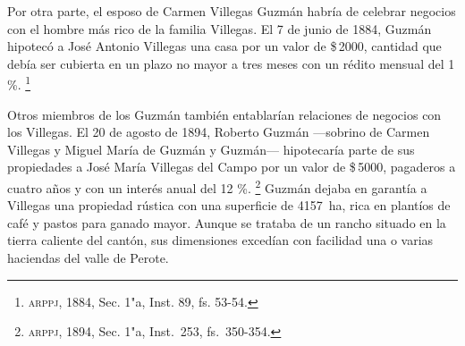 \documentclass[14pt,twoside,final]{extbook} %
\let\oldfootnote\footnote
\renewcommand\footnote[1]{%
\oldfootnote{\hspace{1mm}#1}}
\begin{document}
Por otra parte, el esposo de Carmen Villegas Guzmán habría de celebrar negocios con el hombre más rico de la familia Villegas. El 7 de junio de 1884, Guzmán hipotecó a José Antonio Villegas una casa por un valor de \$\,2000, cantidad que debía ser cubierta en un plazo no mayor a tres meses con un rédito mensual del 1 \%.\footnote{\textsc{arppj}, 1884, Sec. 1"a, Inst. 89, fs. 53-54.}

Otros miembros de los Guzmán también entablarían relaciones de negocios con los Villegas. El 20 de agosto de 1894, Roberto Guzmán ---sobrino de Carmen Villegas y Miguel María de Guzmán y Guzmán--- hipotecaría parte de sus propiedades a José María Villegas del Campo por un valor de \$\,5000, pagaderos a cuatro años y con un interés anual del 12 \%.\footnote{\textsc{arppj}, 1894, Sec. 1"a, Inst.\ 253, fs.\ 350-354.} Guzmán dejaba en garantía a Villegas una propiedad rústica con una superficie de 4157~ha, rica en plantíos de café y pastos para ganado mayor. Aunque se trataba de un rancho situado en la tierra caliente del cantón, sus dimensiones excedían con facilidad una o varias haciendas del valle de Perote.
\end{document}
